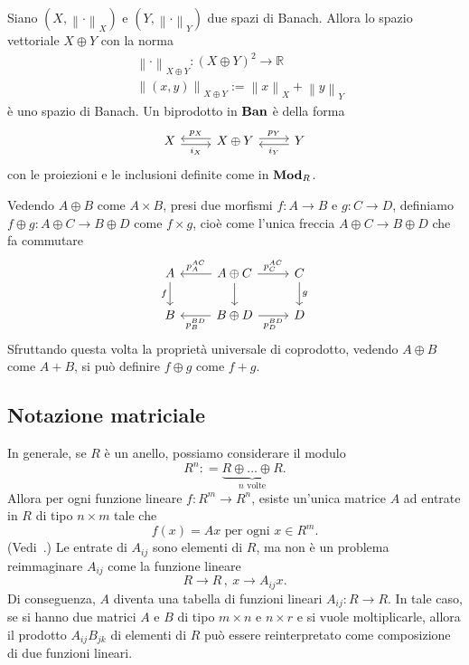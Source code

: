 \begin{example}
  Siano \((X, \left\lVert \cdot \right\rVert_X)\) e
  \((Y, \left\lVert \cdot \right\rVert_Y)\) due spazi di Banach. Allora lo
  spazio vettoriale \(X \oplus Y\) con la norma
  \begin{align*}
    & \left\lVert \cdot \right\rVert_{X \oplus Y} : (X \oplus Y)^2 \to \mathbb{R} \\
    & \left\lVert (x, y) \right\rVert_{X \oplus Y} := \left\lVert x \right\rVert_X + \left\lVert y \right\rVert_Y
  \end{align*}
  è uno spazio di Banach. Un biprodotto in \(\mathbf{Ban}\) è della forma
  \[
    \begin{tikzcd}
      X \ar["{i_X}", r, shift right, swap] & X \oplus Y \ar["{p_X}", l, shift
      right, swap] \ar["{p_Y}", r, shift left] & Y \ar["{i_Y}", l, shift
      left]
    \end{tikzcd}
  \]
  con le proiezioni e le inclusioni definite come in \(\mathbf{Mod}_R\).
\end{example}

Vedendo \(A \oplus B\) come \(A \times B\), presi due morfismi
\(f : A \to B\) e \(g : C \to D\), definiamo
\(f \oplus g : A \oplus C \to B \oplus D\) come \(f \times g\), cioè
come l'unica freccia \(A \oplus C \to B \oplus D\) che fa commutare
\[
  \begin{tikzcd}
    A \ar["{f}", d, swap] & A \oplus C \ar["{p_A^{AC}}", l, swap]
    \ar["{}", d] \ar["{p_C^{AC}}", r] & C \ar["{g}", d] \\
    B & B \oplus D \ar["{p_B^{BD}}", l] \ar["{p_D^{BD}}", r, swap] & D
  \end{tikzcd}
\]
Sfruttando questa volta la proprietà universale di coprodotto, vedendo
\(A \oplus B\) come \(A + B\), si può definire \(f \oplus g\) come
\(f + g\).


\subsection{Notazione matriciale}

\begin{example}
  In generale, se \(R\) è un anello, possiamo considerare il modulo
  \[
    R^n : = \underbrace{R \oplus \dots{} \oplus R}_{n \text{ volte}}.
  \]
  Allora per ogni funzione lineare \(f : R^m \to R^n\), esiste un'unica
  matrice \(A\) ad entrate in \(R\) di tipo \(n \times m\) tale che
  \[
    f(x) = A x \text{ per ogni } x \in R^m .
  \]
  (Vedi~\cite{aluffi:algebra}.) Le entrate di \(A_{ij}\) sono elementi
  di \(R\), ma non è un problema reimmaginare \(A_{ij}\) come la
  funzione lineare
  \[
    R \to R\,,\ x \to A_{ij}x .
  \]
  Di conseguenza, \(A\) diventa una tabella di funzioni lineari
  \(A_{ij} : R \to R\). In tale caso, se si hanno due matrici \(A\) e
  \(B\) di tipo \(m \times n\) e \(n \times r\) e si vuole
  moltiplicarle, allora il prodotto \(A_{ij} B_{jk}\) di elementi di
  \(R\) può essere reinterpretato come composizione di due funzioni
  lineari.
\end{example}

